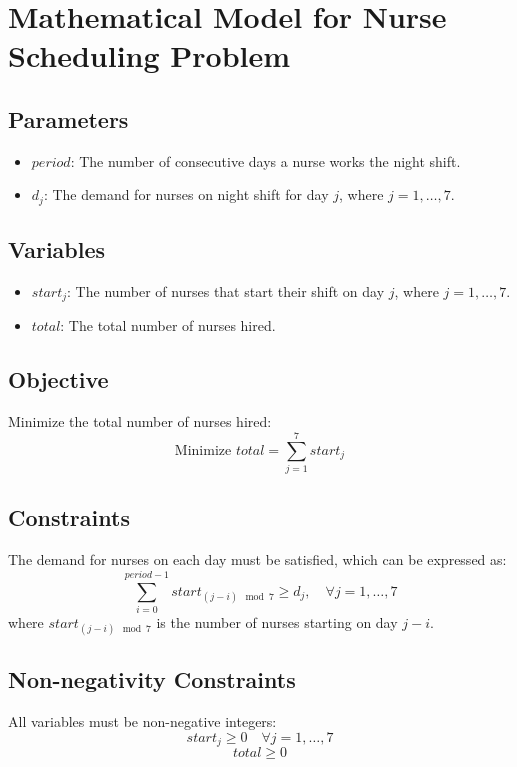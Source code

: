 \documentclass{article}
\begin{document}
\section*{Mathematical Model for Nurse Scheduling Problem}

\subsection*{Parameters}
\begin{itemize}
    \item $period$: The number of consecutive days a nurse works the night shift.
    \item $d_j$: The demand for nurses on night shift for day $j$, where $j = 1, \ldots, 7$.
\end{itemize}

\subsection*{Variables}
\begin{itemize}
    \item $start_j$: The number of nurses that start their shift on day $j$, where $j = 1, \ldots, 7$.
    \item $total$: The total number of nurses hired.
\end{itemize}

\subsection*{Objective}
Minimize the total number of nurses hired:
\[
\text{Minimize } total = \sum_{j=1}^{7} start_j
\]

\subsection*{Constraints}
The demand for nurses on each day must be satisfied, which can be expressed as:
\[
\sum_{i=0}^{period-1} start_{(j-i) \mod 7} \geq d_j, \quad \forall j = 1, \ldots, 7
\]
where $start_{(j-i) \mod 7}$ is the number of nurses starting on day $j-i$.

\subsection*{Non-negativity Constraints}
All variables must be non-negative integers:
\[
start_j \geq 0 \quad \forall j = 1, \ldots, 7
\]
\[
total \geq 0
\]
\end{document}
